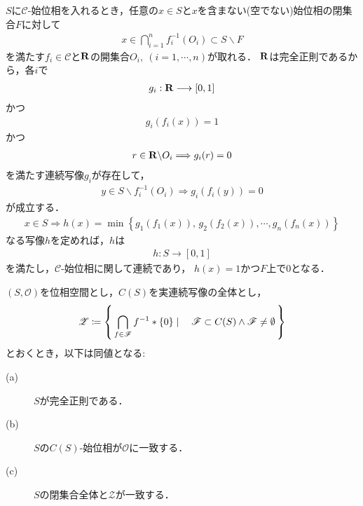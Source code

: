 	\begin{prf}
		$S$に$\mathscr{C}$-始位相を入れるとき，任意の$x \in S$と$x$を含まない(空でない)始位相の閉集合$F$に対して
		\begin{align}
			x \in \bigcap_{i=1}^n f_i^{-1}(O_i) \subset S \backslash F
		\end{align}
		を満たす$f_i \in \mathscr{C}$と$\mathbf{R}$の開集合$O_i,\ (i=1,\cdots,n)$が取れる．
		$\mathbf{R}$は完全正則であるから，各$i$で
		\begin{align}
			g_i:\mathbf{R} \longrightarrow [0,1]
		\end{align}
		かつ
		\begin{align}
			g_i(f_i(x)) = 1
		\end{align}
		かつ
		\begin{align}
			r \in \mathbf{R} \backslash O_i \Longrightarrow g_i(r) = 0
		\end{align}
		を満たす連続写像$g_i$が存在して，
		\begin{align}
			y \in S \backslash f_i^{-1}(O_i)
			\Longrightarrow g_i(f_i(y)) = 0
		\end{align}
		が成立する．
		\begin{align}
			x \in S \Longrightarrow h(x) = \operatorname{min}\left\{g_1(f_1(x)),\, g_2(f_2(x)),\cdots,g_n(f_n(x))\right\}
		\end{align}
		なる写像$h$を定めれば，$h$は
		\begin{align}
			h:S \longrightarrow [0,1]
		\end{align}
		を満たし，$\mathscr{C}$-始位相に関して連続であり，
		$h(x)=1$かつ$F$上で$0$となる．
		\QED
	\end{prf}
	
	\begin{screen}
		\begin{thm}[完全正則空間の位相は実連続写像全体の始位相に一致する]
			$(S,\mathscr{O})$を位相空間とし，$C(S)$を実連続写像の全体とし，
			\begin{align}
				\mathscr{Z} \coloneqq \left\{\, \bigcap_{f \in \mathscr{F}} f^{-1}\ast\{0\} \mid \quad \mathscr{F} \subset C(S) \wedge \mathscr{F} \neq \emptyset\, \right\}
			\end{align}
			とおくとき，以下は同値となる:
			\begin{description}
				\item[(a)] $S$が完全正則である．
				\item[(b)] $S$の$C(S)$-始位相が$\mathscr{O}$に一致する．
				\item[(c)] $S$の閉集合全体と$\mathscr{Z}$が一致する．
			\end{description}
		\end{thm}
	\end{screen}
		
